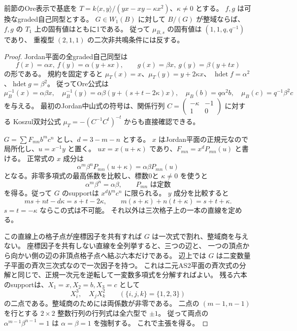 \begin{proposition}[Jordan基底の整域切断は二次共鳴を強制する]
\label{prop:cubic-Jordan-Ore-resonance}
前節のOre表示で基底を
$T=k\langle x,y\rangle/(yx-xy-\kappa x^2)$、$\kappa\ne0$ とする。
$f,g$ は可換なgraded自己同型とする。
$G\in W_1(B)$ に対して $B/(G)$ が整域ならば、
$f,g$ の $T_1$ 上の固有値はともに1である。
従って $\mu_{B,s}$ の固有値は $(1,1,q,q^{-1})$ であり、
重複型 $(2,1,1)$ の二次非共鳴条件には反する。
\end{proposition}
\begin{proof}
Jordan平面の全graded自己同型は
\[
 f(x)=\alpha x,\ f(y)=\alpha(y+s x),\qquad
 g(x)=\beta x,\ g(y)=\beta(y+t x)
\]
の形である。
規約を固定すると $\mu_T(x)=x$、$\mu_T(y)=y+2\kappa x$、
$\operatorname{hdet}f=\alpha^2$、$\operatorname{hdet}g=\beta^2$。
従ってOre公式は
\[
 \mu_B^{-1}(x)=\alpha\beta x,\quad
 \mu_B^{-1}(y)=\alpha\beta(y+(s+t-2\kappa)x),\quad
 \mu_B(b)=q\alpha^2b,\quad \mu_B(c)=q^{-1}\beta^2c
\]
を与える。
最初のJordan中山式の符号は、関係行列
$C=\left(\begin{smallmatrix}-\kappa&-1\\1&0\end{smallmatrix}\right)$ に対する
Koszul双対公式 $\mu_T=-(C^{-1}C^t)^{-t}$ からも直接確認できる。

$G=\sum F_{mn}b^mc^n$ とし、$d=3-m-n$ とする。
$x$ はJordan平面の正規元なので局所化し、$u=x^{-1}y$ と置く。
$ux=x(u+\kappa)$ であり、$F_{mn}=x^dP_{mn}(u)$ と書ける。
正常式の $x$ 成分は
\[
 \alpha^m\beta^nP_{mn}(u+\kappa)=\alpha\beta P_{mn}(u)
\]
となる。非零多項式の最高係数を比較し、標数0と $\kappa\ne0$ を使うと
\[
 \alpha^m\beta^n=\alpha\beta,\qquad P_{mn}\text{ は定数}
\]
を得る。従って $G$ のsupportは $x^db^mc^n$ に限られる。
$y$ 成分を比較すると
\[
 ms+nt-d\kappa=s+t-2\kappa,
 \qquad m(s+\kappa)+n(t+\kappa)=s+t+\kappa.
\]
$s=t=-\kappa$ ならこの式は不可能。
それ以外は三次格子上の一本の直線を定める。

この直線上の格子点が座標因子を共有すれば $G$ は一次式で割れ、整域商を与えない。
座標因子を共有しない直線を全列挙すると、三つの辺と、
一つの頂点から向かい側の辺の非頂点格子点へ結ぶ六本だけである。
辺上では $G$ は二変数量子平面の斉次三次式なので一次因子を持つ。
これは二元AS2平面の斉次式の分解と同じで、正規一次元を逆転して一変数多項式を分解すればよい。
残る六本のsupportは、$X_1=x,X_2=b,X_3=c$ として
\[
 X_i^3,\quad X_jX_k^2\qquad(\{i,j,k\}=\{1,2,3\})
\]
の二点である。整域商のためには両係数が非零である。
二点の $(m-1,n-1)$ を行とする $2\times2$ 整数行列の行列式は全六型で $\pm1$。
従って両点の $\alpha^{m-1}\beta^{n-1}=1$ は $\alpha=\beta=1$ を強制する。
これで主張を得る。
\end{proof}

